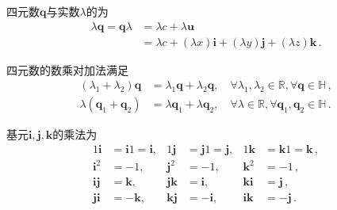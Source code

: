 \begin{definition}
    四元数${\bm q}$与实数$\lambda$的为
    \begin{align}
        \lambda{\bm q}={\bm q}\lambda & =\lambda c+\lambda {\bm u}\nonumber                                              \\
                                      & =\lambda c+(\lambda x)\mathbf{i}+(\lambda y)\mathbf{j}+(\lambda z)\mathbf{k}\, .
    \end{align}
\end{definition}
\begin{proposition}
    四元数的数乘对加法满足
    \begin{align}
        (\lambda_1+\lambda_2){\bm q} & =\lambda_1{\bm q}+\lambda_2{\bm q}, \quad \forall \lambda_1, \lambda_2\in\mathbb{R}, \forall {\bm q}\in\mathbb{H}\, , \\
        \lambda({\bm q}_1+{\bm q}_2) & =\lambda{\bm q}_1+\lambda{\bm q}_2, \quad \forall \lambda\in\mathbb{R}, \forall {\bm q}_1, {\bm q}_2\in\mathbb{H}\, .
    \end{align}
\end{proposition}
\begin{definition}
    基元$\mathbf{i}, \mathbf{j}, \mathbf{k}$的乘法为
    \begin{align}
        1\mathbf{i}  & =\mathbf{i}1=\mathbf{i}, & 1\mathbf{j}  & =\mathbf{j}1=\mathbf{j}, & 1\mathbf{k}  & =\mathbf{k}1=\mathbf{k}\, ,\nonumber \\
        \mathbf{i}^2 & =-1,                     & \mathbf{j}^2 & =-1,                     & \mathbf{k}^2 & =-1\, ,                    \nonumber \\
        \mathbf{ij}  & =\mathbf{k},             & \mathbf{jk}  & =\mathbf{i},             & \mathbf{ki}  & =\mathbf{j}\, ,            \nonumber \\
        \mathbf{ji}  & =-\mathbf{k},            & \mathbf{kj}  & =-\mathbf{i},            & \mathbf{ik}  & =-\mathbf{j}\, .
    \end{align}
\end{definition}
